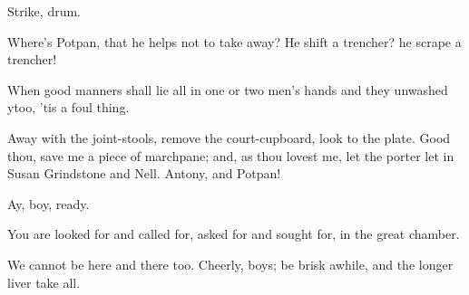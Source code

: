 \begin{speech}
Strike, drum.  \\
\end{speech}


 
\begin{speech}
Where's Potpan, that he helps
not to take away?   He shift a trencher? he
scrape a trencher!
\end{speech}
\begin{speech}
When good manners shall lie all
in one or two men's hands and they unwashed
ytoo, 'tis a foul thing.
\end{speech}
\begin{speech}
Away with the joint-stools, remove
the court-cupboard, look to the plate.
Good thou, save me a piece of marchpane;
and, as thou lovest me, let the porter let in
Susan Grindstone and Nell.   Antony, and
Potpan!
\end{speech}
\begin{speech}
Ay, boy, ready.
\end{speech}
\begin{speech}
You are looked for and called
for, asked for and sought for, in the great
chamber.
\end{speech}
\begin{speech}
We cannot be here and there
too. Cheerly, boys; be brisk awhile, and the
longer liver take all. 
\end{speech}
